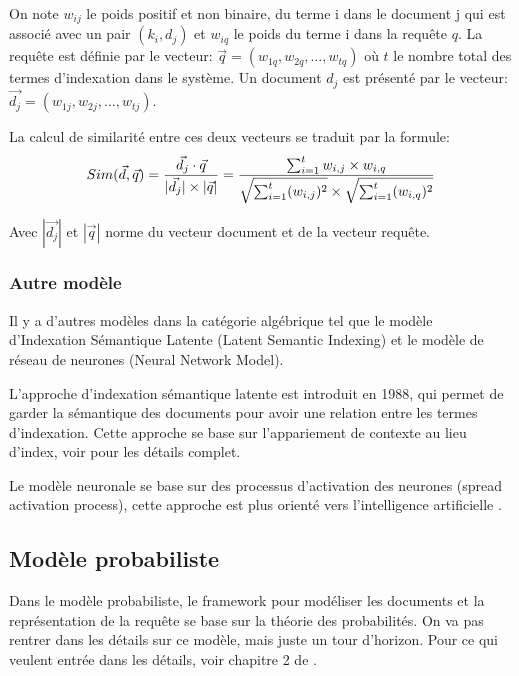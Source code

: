 \begin{definition}
    On note $w_{ij}$ le poids positif et non binaire, du terme i dans le document j qui est associé avec un pair $(k_{i}, d_{j})$ et $w_{iq}$ le poids du terme i dans la requête $q$. La requête est définie par le vecteur: $ \vec{q} = (w_{1q}, w_{2q}, \dots, w_{tq}) $ où $t$ le nombre total des termes d'indexation dans le système. Un document $d_{j}$ est présenté par le vecteur: $ \vec{d_{j}} = (w_{1j}, w_{2j}, \dots, w_{tj}) $.

    La calcul de similarité entre ces deux vecteurs se traduit par la formule:
    \[
        Sim(\vec{d}, \vec{q}) = \frac{\vec{d_{j}} \cdot \vec{q}}{ |\vec{d_{j}}| \times |\vec{q}| } \\
        = \frac{\sum_{i=1}^{t} w_{i,j} \times w_{i,q}}{\sqrt{\sum_{i=1}^{t} (w_{i,j})^2} \times \sqrt{\sum_{i=1}^{t} (w_{i,q})^2}}
    \]

    Avec $ |\vec{d_{j}}| $ et $ |\vec{q}| $ norme du vecteur document et de la vecteur requête.
\end{definition}

\subsubsection{Autre modèle}
Il y a d'autres modèles dans la catégorie algébrique tel que le modèle d'Indexation Sémantique Latente (Latent Semantic Indexing) et le modèle de réseau de neurones (Neural Network Model).

L'approche d'indexation sémantique latente est introduit en 1988, qui permet de garder la sémantique des documents pour avoir une relation entre les termes d'indexation. Cette approche se base sur l’appariement de contexte au lieu d'index, voir  \citep{modern-ir} pour les détails complet.

Le modèle neuronale se base sur des processus d'activation des neurones (spread activation process), cette approche est plus orienté vers l’intelligence artificielle \citep*{modern-ir}.

\subsection{Modèle probabiliste}
Dans le modèle probabiliste, le framework pour modéliser les documents et la représentation de la requête se base sur la théorie des probabilités. On va pas rentrer dans les détails sur ce modèle, mais juste un tour d'horizon. Pour ce qui veulent entrée dans les détails, voir chapitre 2 de \citep{modern-ir}.

